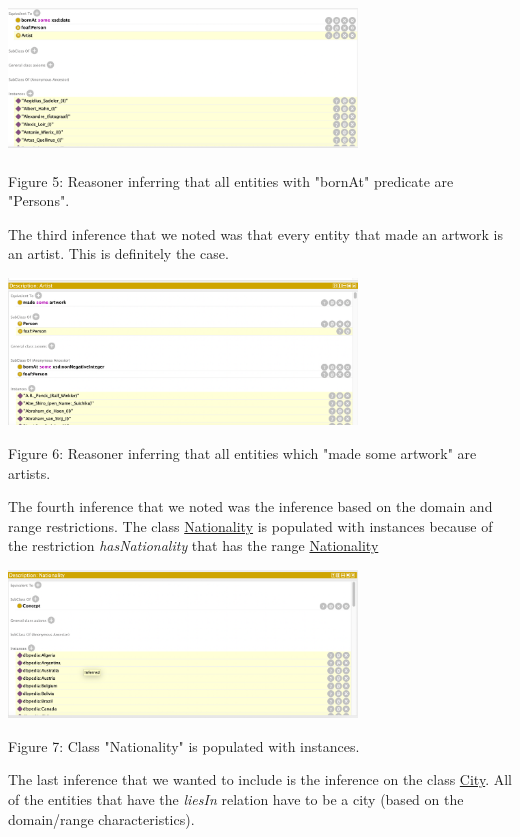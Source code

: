 \documentclass{article}
\begin{document}
\begin{center}
\includegraphics[width=350, height=150]{first_inference.png}
\newline
\caption{Figure 5: Reasoner inferring that all entities with "bornAt" predicate are "Persons".}
\end{center}


The third inference that we noted was that every entity that made an artwork is an artist. This
is definitely the case.
\begin{center}
\includegraphics[width=350]{second_inferece.png}
\newline
\caption{Figure 6: Reasoner inferring that all entities which "made some artwork" are artists.}
\end{center}

The fourth inference that we noted was the inference based on the domain and range restrictions. The class \underline{Nationality} is populated with instances because of the restriction \textit{hasNationality} that has the range \underline{Nationality}
\begin{center}
\includegraphics[width=350]{fourth_inference.png}
\newline
\caption{Figure 7: Class "Nationality" is populated with instances.}
\end{center}
\newline
The last inference that we wanted to include is the inference on the class \underline{City}. All of the entities that have the \textit{liesIn} relation have to be a city (based on the domain/range characteristics).
\end{document}
